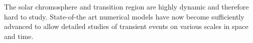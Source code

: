 \documentclass{aa}
\begin{document}
\abstract%
%
{%
%
The solar chromosphere and transition region are highly dynamic and therefore hard to study. 
State-of-the art numerical models have now become sufficiently advanced to allow detailed studies of transient events on various scales in space and time. 



}
\end{document}
